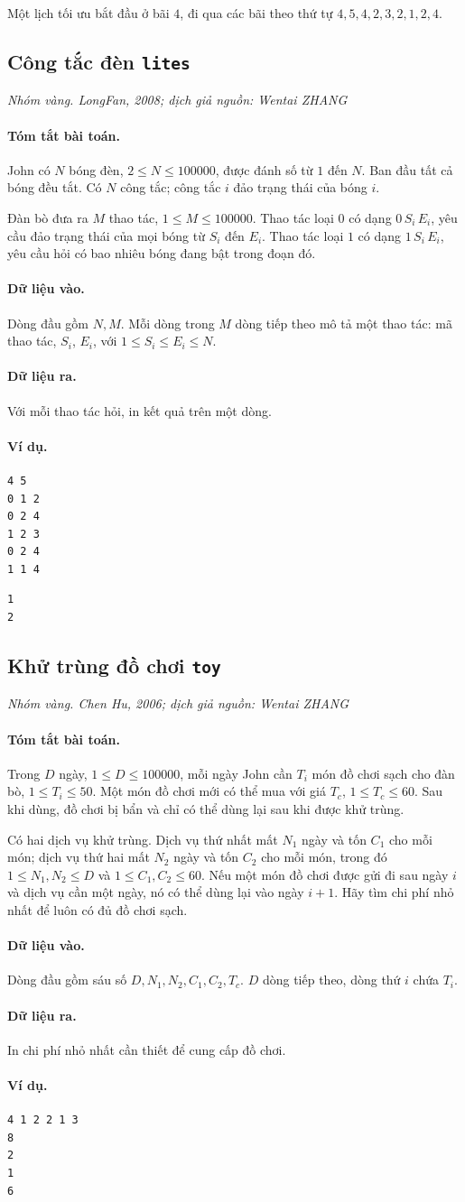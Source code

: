 \documentclass[11pt]{article}
\newcommand{\problem}[4]{%
  \subsection[#1 (#2)]{#1 \hfill {\normalsize\texttt{#2}}}%
  \noindent\textit{#3. #4}\par\smallskip
}
\newcommand{\iosec}[1]{\paragraph{#1}}
\begin{document}
Một lịch tối ưu bắt đầu ở bãi \(4\), đi qua các bãi theo thứ tự
\(4,5,4,2,3,2,1,2,4\).

\problem{Công tắc đèn}{lites}{Nhóm vàng}{LongFan, 2008; dịch giả nguồn: Wentai ZHANG}

\iosec{Tóm tắt bài toán.}
John có \(N\) bóng đèn, \(2\le N\le 100000\), được đánh số từ \(1\) đến
\(N\). Ban đầu tất cả bóng đều tắt. Có \(N\) công tắc; công tắc \(i\) đảo
trạng thái của bóng \(i\).

Đàn bò đưa ra \(M\) thao tác, \(1\le M\le 100000\). Thao tác loại \(0\) có
dạng \(0\,S_i\,E_i\), yêu cầu đảo trạng thái của mọi bóng từ \(S_i\) đến
\(E_i\). Thao tác loại \(1\) có dạng \(1\,S_i\,E_i\), yêu cầu hỏi có bao
nhiêu bóng đang bật trong đoạn đó.

\iosec{Dữ liệu vào.}
Dòng đầu gồm \(N,M\). Mỗi dòng trong \(M\) dòng tiếp theo mô tả một thao tác:
mã thao tác, \(S_i\), \(E_i\), với \(1\le S_i\le E_i\le N\).

\iosec{Dữ liệu ra.}
Với mỗi thao tác hỏi, in kết quả trên một dòng.

\iosec{Ví dụ.}
\begin{verbatim}
4 5
0 1 2
0 2 4
1 2 3
0 2 4
1 1 4
\end{verbatim}

\begin{verbatim}
1
2
\end{verbatim}

\problem{Khử trùng đồ chơi}{toy}{Nhóm vàng}{Chen Hu, 2006; dịch giả nguồn: Wentai ZHANG}

\iosec{Tóm tắt bài toán.}
Trong \(D\) ngày, \(1\le D\le 100000\), mỗi ngày John cần \(T_i\) món đồ
chơi sạch cho đàn bò, \(1\le T_i\le 50\). Một món đồ chơi mới có thể mua với
giá \(T_c\), \(1\le T_c\le 60\). Sau khi dùng, đồ chơi bị bẩn và chỉ có thể
dùng lại sau khi được khử trùng.

Có hai dịch vụ khử trùng. Dịch vụ thứ nhất mất \(N_1\) ngày và tốn \(C_1\)
cho mỗi món; dịch vụ thứ hai mất \(N_2\) ngày và tốn \(C_2\) cho mỗi món,
trong đó \(1\le N_1,N_2\le D\) và \(1\le C_1,C_2\le 60\). Nếu một món đồ
chơi được gửi đi sau ngày \(i\) và dịch vụ cần một ngày, nó có thể dùng lại
vào ngày \(i+1\). Hãy tìm chi phí nhỏ nhất để luôn có đủ đồ chơi sạch.

\iosec{Dữ liệu vào.}
Dòng đầu gồm sáu số \(D,N_1,N_2,C_1,C_2,T_c\). \(D\) dòng tiếp theo, dòng
thứ \(i\) chứa \(T_i\).

\iosec{Dữ liệu ra.}
In chi phí nhỏ nhất cần thiết để cung cấp đồ chơi.

\iosec{Ví dụ.}
\begin{verbatim}
4 1 2 2 1 3
8
2
1
6
\end{verbatim}
\end{document}
